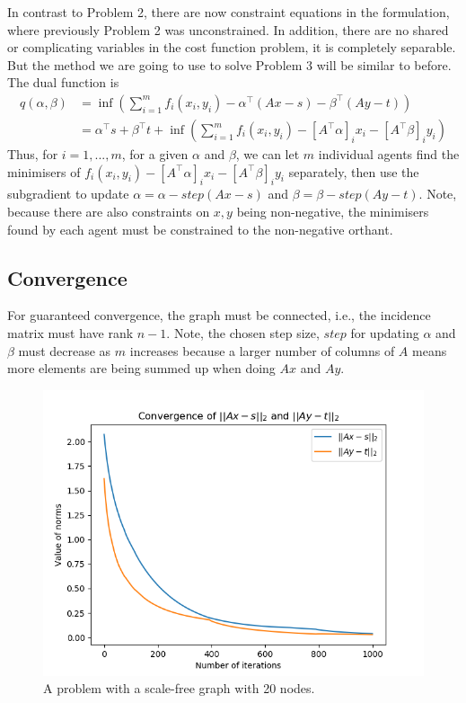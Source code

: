 \documentclass[12pt]{article}
\begin{document}
In contrast to Problem 2, there are now constraint equations in the formulation, where previously Problem 2 was unconstrained. In addition, there are no shared or complicating variables in the cost function problem, it is completely separable. But the method we are going to use to solve Problem 3 will be similar to before. The dual function is
\begin{align*}
q(\alpha,\beta)&=\inf\left(\sum\limits_{i=1}^m f_i(x_i,y_i)-\alpha^\top (Ax-s)-\beta^\top(Ay-t)\right)\\
&=\alpha^\top s+\beta^\top t + \inf\left(\sum\limits_{i=1}^m f_i(x_i,y_i)-[A^\top\alpha]_ix_i-[A^\top \beta]_iy_i\right)
\end{align*}
Thus, for $i=1,...,m$, for a given $\alpha$ and $\beta$, we can let $m$ individual agents find the minimisers of $f_i(x_i,y_i)-[A^\top\alpha]_ix_i-[A^\top \beta]_iy_i$ separately, then use the subgradient to update $\alpha=\alpha-step(Ax-s)$ and $\beta=\beta-step(Ay-t)$. Note, because there are also constraints on $x,y$ being non-negative, the minimisers found by each agent must be constrained to the non-negative orthant. 


\subsection*{Convergence}

For guaranteed convergence, the graph must be connected, i.e., the incidence matrix must have rank $n-1$. Note, the chosen step size, $step$ for updating $\alpha$ and $\beta$ must decrease as $m$ increases because a larger number of columns of $A$ means more elements are being summed up when doing $Ax$ and $Ay$.

\begin{figure}[H]
	\centering
	\includegraphics[scale=0.91]{Problem3-Convergence.png}
	\caption{A problem with a scale-free graph with 20 nodes.}
\end{figure}
\end{document}
